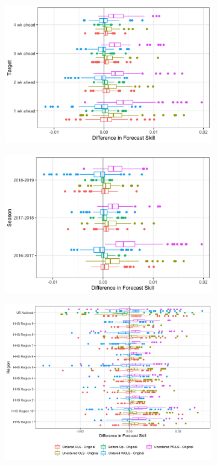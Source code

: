 \documentclass{umassthesis}          %
\begin{document}
     \begin{figure}
   
\begin{subfigure}{.5\textwidth}
  \centering
    \includegraphics[scale=.14]{target.png}
\end{subfigure}
\begin{subfigure}{.5\textwidth}
  \centering
    \includegraphics[scale=.14]{season_results.png}
\end{subfigure}
\begin{subfigure}{\textwidth}
  \centering
\includegraphics[scale=.175]{region_results.png}
\end{subfigure}


\end{figure}
\end{document}
